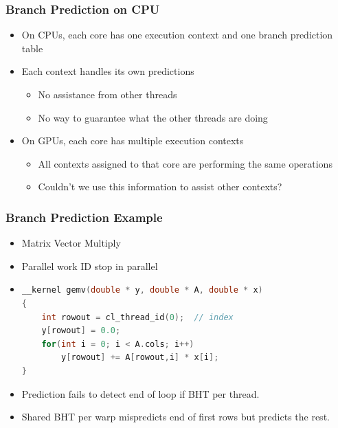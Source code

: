 \documentclass{beamer}
\begin{document}
\begin{frame}
	\frametitle{Branch Prediction on CPU}
	\begin{itemize}
		\item<1-> On CPUs, each core has one execution context and one branch prediction table
		\item<2-> Each context handles its own predictions
		\begin{itemize}
			\item<2-> No assistance from other threads 
			\item<2-> No way to guarantee what the other threads are doing
		\end{itemize}
		\item<3-> On GPUs, each core has multiple execution contexts
		\begin{itemize}
			\item<3-> All contexts assigned to that core are performing the same operations
			\item<3-> Couldn't we use this information to assist other contexts?
		\end{itemize}
	\end{itemize}
\end{frame}

\begin{frame}[fragile]
	\frametitle{Branch Prediction Example}
	\begin{itemize}
		\item<1-> Matrix Vector Multiply
		\item<2-> Parallel work ID stop in parallel
		\item<3->
	\begin{lstlisting}[language=C,basicstyle=\footnotesize,frame=single,tabsize=4,title=GemV.cl]
__kernel gemv(double * y, double * A, double * x)
{
    int rowout = cl_thread_id(0);  // index
    y[rowout] = 0.0;
    for(int i = 0; i < A.cols; i++)
        y[rowout] += A[rowout,i] * x[i];
}
	\end{lstlisting}
		\item<4-> Prediction fails to detect end of loop if BHT per thread.
		\item<5-> Shared BHT per warp mispredicts end of first rows but predicts the rest.
	\end{itemize}
\end{frame}
\end{document}

